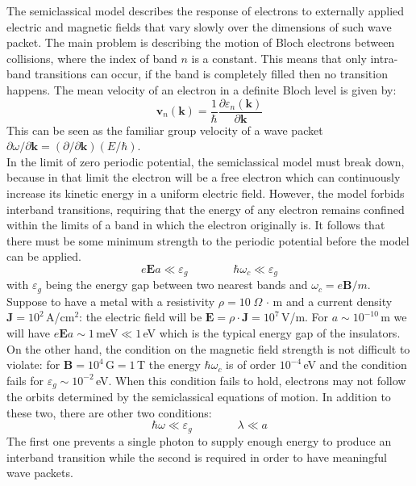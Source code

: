 \documentclass[10.75pt,a4paper,openright,bottom=2cm]{article}
\renewcommand{\Vec}[1]{\boldsymbol{#1}}
\begin{document}
The semiclassical model describes the response of electrons to externally applied electric and magnetic fields that vary slowly over the dimensions of such wave packet. The main problem is describing the motion of Bloch electrons between collisions, where the index of band $n$ is a constant. This means that only intra-band transitions can occur, if the band is completely filled then no transition happens. The mean velocity of an electron in a definite Bloch level is given by:
\begin{equation}
\label{eqmot2}
\Vec{v}_n(\Vec{k})=\frac{1}{\hbar}\frac{\partial \varepsilon_n(\Vec{k})}{\partial\Vec{k}}
\end{equation}
This can be seen as the familiar group velocity of a wave packet $\partial\omega/\partial\Vec{k}=(\partial/\partial\Vec{k})(E/\hbar)$.\\
In the limit of zero periodic potential, the semiclassical model must break down, because in that limit the electron will be a free electron which can continuously increase its kinetic energy in a uniform electric field. However, the model forbids interband transitions, requiring that the energy of any electron remains confined within the limits of a band in which the electron originally is. It follows that there must be some minimum strength to the periodic potential before the model can be applied. 
\[
e\Vec{E}a\ll \varepsilon_g \qquad\qquad \hbar\omega_c\ll \varepsilon_g 
\]
with $\varepsilon_g$ being the energy gap between two nearest bands and $\omega_c=e\Vec{B}/m$.\\
Suppose to have a metal with a resistivity $\rho=10\;\Omega\,\cdot$\,m and a current density $\Vec{J}=10^2$\,A/cm$^2$: the electric field will be $\Vec{E}=\rho\cdot\Vec{J}=10^7$\,V/m. For $a\sim10^{-10}$\,m we will have $e\Vec{E}a\sim1$\,meV$\ll1$\,eV which is the typical energy gap of the insulators. On the other hand, the condition on the magnetic field strength is not difficult to violate: for $\Vec{B}=10^4$\,G$=1$\,T the energy $\hbar\omega_c$ is of order $10^{-4}$\,eV and the condition fails for $\varepsilon_g\sim10^{-2}$\,eV. When this condition fails to hold, electrons may not follow the orbits determined by the semiclassical equations of motion. In addition to these two, there are other two conditions:
\[
\hbar\omega\ll \varepsilon_g \qquad \qquad \lambda\ll a
\]
The first one prevents a single photon to supply enough energy to produce an interband transition while the second is required in order to have meaningful wave packets.\\
\end{document}
